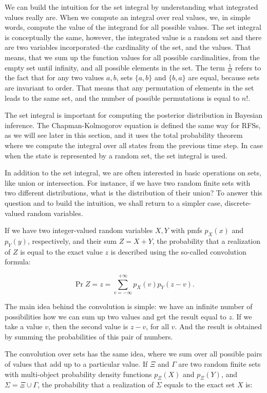 We can build the intuition for the set integral by understanding what integrated values really are. When we compute an integral over real values, we, in simple words, compute the value of the integrand for all possible values. The set integral is conceptually the same, however, the integrated value is a random set and there are two variables incorporated--the cardinality of the set, and the values. That means, that we sum up the function values for all possible cardinalities, from the empty set until infinity, and all possible elements in the set. The term $\frac{1}{n !}$ refers to the fact that for any two values $a, b$, sets $\{a, b\}$ and $\{b, a\}$ are equal, because sets are invariant to order. That means that any permutation of elements in the set leads to the same set, and the number of possible permutations is equal to $n!$.

The set integral is important for computing the posterior distribution in Bayesian inference. The Chapman-Kolmogorov equation is defined the same way for RFSs, as we will see later in this section, and it uses the total probability theorem where we compute the integral over all states from the previous time step. In case when the state is represented by a random set, the set integral is used.

In addition to the set integral, we are often interested in basic operations on sets, like union or intersection. For instance, if we have two random finite sets with two different distributions, what is the distribution of their union? To answer this question and to build the intuition, we shall return to a simpler case, discrete-valued random variables.

If we have two integer-valued random variables $X, Y$ with pmfs $p_X(x)$ and $p_Y(y)$, respectively, and their sum $Z = X + Y$, the probability that a realization of $Z$ is equal to the exact value $z$ is described using the so-called convolution formula:

\begin{equation}
    \Pr{Z = z} = \sum_{v = -\infty}^{+\infty} p_X(v) p_Y(z - v).
\end{equation}

The main idea behind the convolution is simple: we have an infinite number of possibilities how we can sum up two values and get the result equal to $z$. If we take a value $v$, then the second value is $z-v$, for all $v$. And the result is obtained by summing the probabilities of this pair of numbers.

The convolution over sets has the same idea, where we sum over all possible pairs of values that add up to a particular value. If $\Xi$ and $\Gamma$ are two random finite sets with multi-object probability density functions $p_\Xi(X)$ and $p_\Xi(Y)$, and $\Sigma = \Xi \cup \Gamma$, the probability that a realization of $\Sigma$ equals to the exact set $X$ is:

